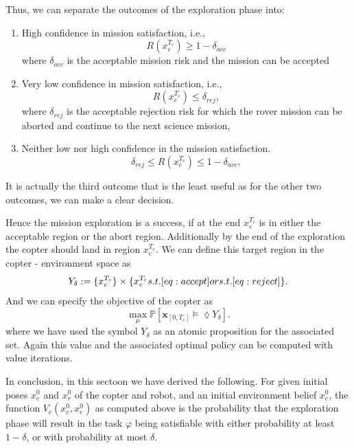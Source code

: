 \documentclass[conference]{IEEEtran}
\begin{document}
Thus, we can separate the outcomes of the exploration phase into:
\begin{enumerate}
	\item High confidence in mission satisfaction, i.e.,
\begin{equation}\label{eq:accept}
	R(x_e^{T_c})\geq 1-\delta_{acc}
\end{equation}
where $\delta_{acc}$ is the acceptable mission risk and the mission can be accepted
	\item Very low confidence in mission satisfaction,  i.e., 
\begin{equation}\label{eq:reject}
	R(x_e^{T_c})\leq \delta_{rej},
\end{equation}
where $\delta_{rej}$ is the acceptable rejection risk for which the  rover mission can be aborted and continue to the next science mission,
	\item Neither low nor high confidence in the mission satisfaction.
	 \begin{equation}
	\delta_{rej} \leq R(x_e^{T_c})\leq 1-\delta_{acc},
\end{equation}
\end{enumerate}
It is actually the third outcome that is the least useful as for the other two outcomes, we can make a clear decision.

Hence the mission exploration is a success, if  at the end $x_e^{T_c}$  is in either the acceptable region or the abort region.  Additionally by the end of the exploration the copter should land  in region $x^{T_c}_c$. We can define this target region in the copter - environment space as
\begin{equation}
Y_\delta:=\{x^{T_c}_c\}\times 
	\{x_e^{T_c} \mbox{ s.t.  }\eqref{eq:accept}\mbox{ or s.t. }\eqref{eq:reject} \}.
\end{equation}
And we can specify the objective of the copter as 
\begin{equation}
\label{eq:coptervalue}
	\max_{\mu} \mathbb{P} \left[ \mathbf{x}_{[0, T_c]} \models \lozenge Y_\delta \right].
\end{equation}
where we have used the symbol $ Y_\delta $ as an atomic proposition for the associated set.
Again this value and the associated optimal policy can be computed with value iterations.

In conclusion, in this sectoon we have derived the following.
	For given initial poses $x_c^0$ and $x_r^0$ of the copter and robot, and an initial environment belief $x_e^0$, the function $V_c(x_c^0, x_e^0)$ as computed above is the probability that the exploration phase will result in the task $\varphi$ being satisfiable with either probability at least $1- \delta$, or with probability at most $\delta$.  
\end{document}
